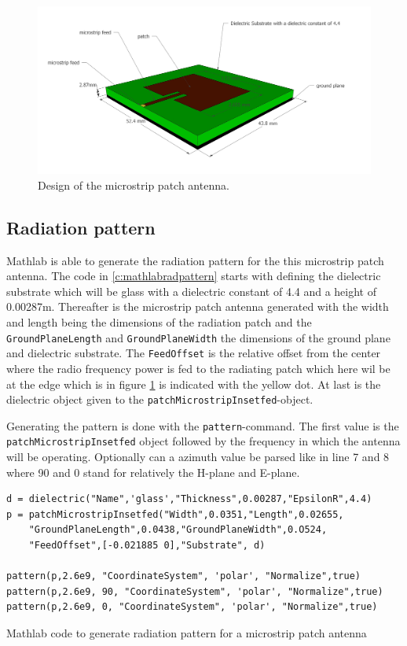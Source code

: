 \begin{figure}[h!]
\centering
  \includegraphics[width=\textwidth]{../images/MicrostripAntenna.jpg}
  \caption{Design of the microstrip patch antenna.}
  \label{fig:antennadesign}
\end{figure}

\subsection{Radiation pattern}
Mathlab is able to generate the radiation pattern for the this microstrip patch antenna.
The code in  \ref{c:mathlabradpattern} starts with defining the dielectric substrate which will be glass with a dielectric constant
of 4.4 and a height of 0.00287m. Thereafter is the microstrip patch antenna generated with the width and length being the dimensions
of the radiation patch and the \verb|GroundPlaneLength| and \verb|GroundPlaneWidth| the dimensions of the ground plane and dielectric substrate.
The \verb|FeedOffset| is the relative offset from the center where the radio frequency power is fed to the radiating patch which here wil be
at the edge which is in figure \ref{fig:antennadesign} is indicated with the yellow dot. At last is the dielectric object given to the 
\verb|patchMicrostripInsetfed|-object.

Generating the pattern is done with the \verb|pattern|-command. The first value is the \verb|patchMicrostripInsetfed| object followed by the frequency
in which the antenna will be operating. Optionally can a azimuth value be parsed like in line 7 and 8 where 90 and 0 stand for relatively the H-plane and E-plane.

\begin{listing}[h!]
\begin{verbatim}
d = dielectric("Name",'glass',"Thickness",0.00287,"EpsilonR",4.4)
p = patchMicrostripInsetfed("Width",0.0351,"Length",0.02655,
    "GroundPlaneLength",0.0438,"GroundPlaneWidth",0.O524,
    "FeedOffset",[-0.021885 0],"Substrate", d)

pattern(p,2.6e9, "CoordinateSystem", 'polar', "Normalize",true)
pattern(p,2.6e9, 90, "CoordinateSystem", 'polar', "Normalize",true)
pattern(p,2.6e9, 0, "CoordinateSystem", 'polar', "Normalize",true)
\end{verbatim}
\caption{Mathlab code to generate radiation pattern for a microstrip patch antenna}
\label{c:mathlabradpattern}
\end{listing}


